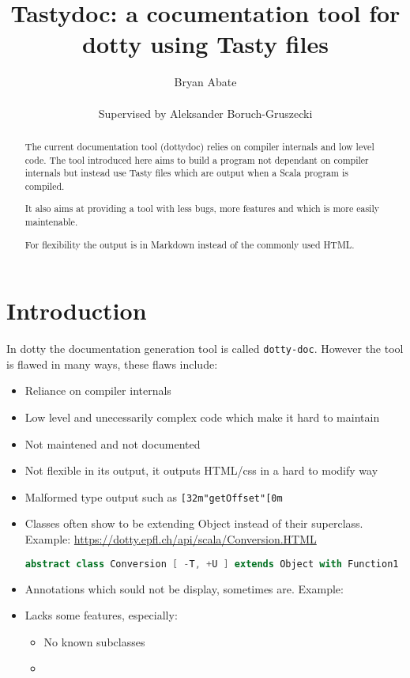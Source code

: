 \documentclass{report}
\begin{document}
\title{Tastydoc: a cocumentation tool for dotty using Tasty files}
\author{Bryan Abate
\\\\\small{Supervised by Aleksander Boruch-Gruszecki}}

\maketitle

\begin{abstract}
The current documentation tool (dottydoc) relies on compiler internals and low level code. The tool introduced here aims to build a program not dependant on compiler internals but instead use Tasty files which are output when a Scala program is compiled.

It also aims at providing a tool with less bugs, more features and which is more easily maintenable.

For flexibility the output is in Markdown instead of the commonly used HTML.
\end{abstract}

\tableofcontents

\chapter{Introduction}
In dotty the documentation generation tool is called \texttt{dotty-doc}. However the tool is flawed in many ways, these flaws include:
\begin{itemize}
    \item Reliance on compiler internals
    \item Low level and unecessarily complex code which make it hard to maintain
    \item Not maintened and not documented
    \item Not flexible in its output, it outputs HTML/css in a hard to modify way
    \item Malformed type output such as \texttt{[32m"getOffset"[0m}
    \item Classes often show to be extending Object instead of their superclass. Example: \url{https://dotty.epfl.ch/api/scala/Conversion.HTML}
\begin{lstlisting}[language=scala]
abstract class Conversion [ -T, +U ] extends Object with Function1
\end{lstlisting}
    \item Annotations which sould not be display, sometimes are. Example:
    \item Lacks some features, especially:
    \begin{itemize}
        \item No known subclasses
        \item 
    \end{itemize}
\end{itemize}
\end{document}
